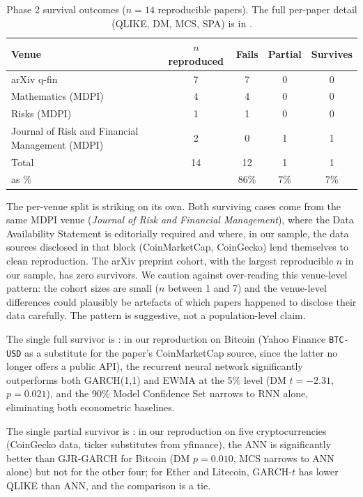 \begin{table}[H]
\centering
\small
\caption{Phase 2 survival outcomes ($n=14$ reproducible papers). The full per-paper detail (QLIKE, DM, MCS, SPA) is in .}\label{tab:phase2_survival}
\begin{tabular}{@{}p{6.5cm}cccc@{}}
\toprule
Venue & $n$ reproduced & Fails & Partial & Survives \\
\midrule
arXiv q-fin & 7 & 7 & 0 & 0 \\
Mathematics (MDPI) & 4 & 4 & 0 & 0 \\
Risks (MDPI) & 1 & 1 & 0 & 0 \\
Journal of Risk and Financial Management (MDPI) & 2 & 0 & 1 & 1 \\
\midrule
Total & 14 & 12 & 1 & 1 \\
\multicolumn{2}{l}{\hspace{2em}as \%} & 86\% & 7\% & 7\% \\
\bottomrule
\end{tabular}
\end{table}

The per-venue split is striking on its own. Both surviving cases come from the same MDPI venue (\emph{Journal of Risk and Financial Management}), where the Data Availability Statement is editorially required and where, in our sample, the data sources disclosed in that block (CoinMarketCap, CoinGecko) lend themselves to clean reproduction. The arXiv preprint cohort, with the largest reproducible $n$ in our sample, has zero survivors. We caution against over-reading this venue-level pattern: the cohort sizes are small ($n$ between 1 and 7) and the venue-level differences could plausibly be artefacts of which papers happened to disclose their data carefully. The pattern is suggestive, not a population-level claim.

The single full survivor is \citet{Shen2021}: in our reproduction on Bitcoin (Yahoo Finance \texttt{BTC-USD} as a substitute for the paper's CoinMarketCap source, since the latter no longer offers a public API), the recurrent neural network significantly outperforms both GARCH(1,1) and EWMA at the 5\% level (DM $t=-2.31$, $p=0.021$), and the 90\% Model Confidence Set narrows to RNN alone, eliminating both econometric baselines.

The single partial survivor is \citet{MostafaSahaIslamNguyen2021}: in our reproduction on five cryptocurrencies (CoinGecko data, ticker substitutes from yfinance), the ANN is significantly better than GJR-GARCH for Bitcoin (DM $p=0.010$, MCS narrows to ANN alone) but not for the other four; for Ether and Litecoin, GARCH-$t$ has lower QLIKE than ANN, and the comparison is a tie.

